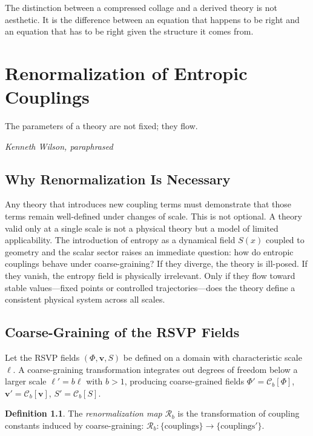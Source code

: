 \documentclass[12pt,a4paper,openany]{book}
\theoremstyle{plain}
\theoremstyle{definition}
\newtheorem{definition}[theorem]{Definition}
\theoremstyle{remark}
\begin{document}
The distinction between a compressed collage and a derived theory is not aesthetic. It is the difference between an equation that happens to be right and an equation that has to be right given the structure it comes from.

\chapter{Renormalization of Entropic Couplings}
\label{chap:entropy_renormalization}

\epigraph{%
  The parameters of a theory are not fixed; they flow.
}{%
  \textit{Kenneth Wilson, paraphrased}}

\section{Why Renormalization Is Necessary}

Any theory that introduces new coupling terms must demonstrate that those terms remain well-defined under changes of scale. This is not optional. A theory valid only at a single scale is not a physical theory but a model of limited applicability. The introduction of entropy as a dynamical field $S(x)$ coupled to geometry and the scalar sector raises an immediate question: how do entropic couplings behave under coarse-graining? If they diverge, the theory is ill-posed. If they vanish, the entropy field is physically irrelevant. Only if they flow toward stable values---fixed points or controlled trajectories---does the theory define a consistent physical system across all scales.

\section{Coarse-Graining of the RSVP Fields}

Let the RSVP fields $(\Phi,\mathbf{v},S)$ be defined on a domain with characteristic scale $\ell$. A coarse-graining transformation integrates out degrees of freedom below a larger scale $\ell' = b\ell$ with $b > 1$, producing coarse-grained fields $\Phi' = \mathcal{C}_b[\Phi]$, $\mathbf{v}' = \mathcal{C}_b[\mathbf{v}]$, $S' = \mathcal{C}_b[S]$.

\begin{definition}
The \emph{renormalization map} $\mathcal{R}_b$ is the transformation of coupling constants induced by coarse-graining: $\mathcal{R}_b : \{\text{couplings}\} \to \{\text{couplings}'\}$.
\end{definition}
\end{document}
